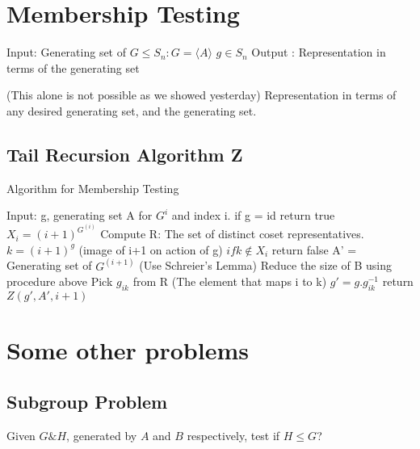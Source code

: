 \section{Membership Testing}
\begin{definition}
Input: Generating set of $G\leq S_n: G= \langle A \rangle $ 	$g\in S_n$
Output : Representation in terms of the generating set 
\end{definition}
(This alone is not
possible as we showed yesterday) Representation in terms of any desired
generating set, and the generating set.

\subsection{Tail Recursion Algorithm Z}
\begin{algorithm}
\caption{Algorithm for Membership Testing}\label{orbit}
\label{alg:tail_rec_membership}
\begin{algorithmic}[1]
\item
Input: g, generating set A for $G^i$ and index i.\newline
if g = id return true\newline
$X_i = (i+1)^{G^{(i)}}$\newline
Compute R: The set of distinct coset representatives.\newline
$k = (i+1)^g$ (image of i+1 on action of g)\newline
$if k \notin X_i$ return false\newline
A' = Generating set of $G^{(i+1)}$ (Use Schreier's Lemma)\newline
Reduce the size of B using procedure above\newline
Pick $g_{ik}$ from R (The element that maps i to k)\newline
$g' = g.g_{ik}^{-1}$\newline
return $Z(g', A', i+1)$\newline
\end{algorithmic}
\end{algorithm}

\section{Some other problems}
\subsection{Subgroup Problem}
Given $G \& H$, generated by $A$ and $B$ respectively, test if $H\leq G$?

